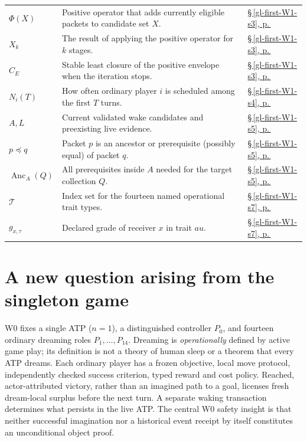\documentclass[11pt,letterpaper]{article}
\begin{document}
\begin{longtable}{@{}>{\raggedright\arraybackslash}p{.215\linewidth}>{\raggedright\arraybackslash}p{.585\linewidth}>{\raggedright\arraybackslash}p{.14\linewidth}@{}}
\textbf{$\Phi(X)$} & Positive operator that adds currently eligible packets to candidate set $X$. & \hyperref[gl-first-W1-s3]{\S\,\ref*{gl-first-W1-s3}, p.\,\pageref*{gl-first-W1-s3}} \\
\textbf{$X_k$} & The result of applying the positive operator for $k$ stages. & \hyperref[gl-first-W1-s3]{\S\,\ref*{gl-first-W1-s3}, p.\,\pageref*{gl-first-W1-s3}} \\
\textbf{$C_E$} & Stable least closure of the positive envelope when the iteration stops. & \hyperref[gl-first-W1-s3]{\S\,\ref*{gl-first-W1-s3}, p.\,\pageref*{gl-first-W1-s3}} \\
\textbf{$N_i(T)$} & How often ordinary player $i$ is scheduled among the first $T$ turns. & \hyperref[gl-first-W1-s4]{\S\,\ref*{gl-first-W1-s4}, p.\,\pageref*{gl-first-W1-s4}} \\
\textbf{$A,L$} & Current validated wake candidates and preexisting live evidence. & \hyperref[gl-first-W1-s5]{\S\,\ref*{gl-first-W1-s5}, p.\,\pageref*{gl-first-W1-s5}} \\
\textbf{$p\preceq q$} & Packet $p$ is an ancestor or prerequisite (possibly equal) of packet $q$. & \hyperref[gl-first-W1-s5]{\S\,\ref*{gl-first-W1-s5}, p.\,\pageref*{gl-first-W1-s5}} \\
\textbf{$\operatorname{Anc}_A(Q)$} & All prerequisites inside $A$ needed for the target collection $Q$. & \hyperref[gl-first-W1-s5]{\S\,\ref*{gl-first-W1-s5}, p.\,\pageref*{gl-first-W1-s5}} \\
\textbf{$\mathcal T$} & Index set for the fourteen named operational trait types. & \hyperref[gl-first-W1-s7]{\S\,\ref*{gl-first-W1-s7}, p.\,\pageref*{gl-first-W1-s7}} \\
\textbf{$g_{x,\tau}$} & Declared grade of receiver $x$ in trait $	au$. & \hyperref[gl-first-W1-s7]{\S\,\ref*{gl-first-W1-s7}, p.\,\pageref*{gl-first-W1-s7}} \\
\end{longtable}\endgroup
\clearpage
\clearpage

\section{A new question arising from the singleton game}\label{gl-first-W1-s1}
W0 \cite{W0} fixes a single ATP ($n=1$), a distinguished controller $P_0$, and fourteen ordinary dreaming roles $P_1,\ldots,P_{14}$. Dreaming is \emph{operationally} defined by active game play; its definition is not a theory of human sleep or a theorem that every ATP dreams. Each ordinary player has a frozen objective, local move protocol, independently checked success criterion, typed reward and cost policy. Reached, actor-attributed victory, rather than an imagined path to a goal, licenses fresh dream-local surplus before the next turn. A separate waking transaction determines what persists in the live ATP. The central W0 safety insight is that neither successful imagination nor a historical event receipt by itself constitutes an unconditional object proof.
\end{document}
